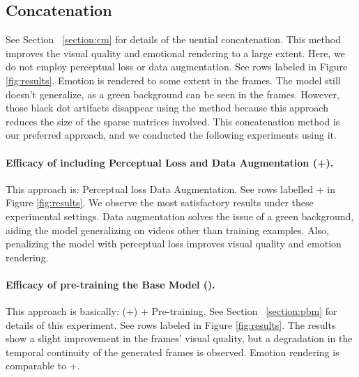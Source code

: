 \documentclass[accepted]{uai2023}
\begin{document}
\subsection{ Concatenation}
See Section ~\ref{section:cm} for details of the uential concatenation. This method improves the visual quality and emotional rendering to a large extent. Here, we do not employ perceptual loss or data augmentation. See rows labeled  in Figure \ref{fig:results}. Emotion is rendered to some extent in the frames. The model still doesn't generalize, as a green background can be seen in the frames. However, those black dot artifacts disappear using the method  because this approach reduces the size of the sparse matrices involved. This concatenation method is our preferred approach, and we conducted the following experiments using it.



\paragraph{Efficacy of including Perceptual Loss and Data Augmentation (+).} 
\label{exp3}
This approach is:   Perceptual loss  Data Augmentation.  See rows labelled + in Figure \ref{fig:results}. We observe the most satisfactory results under these experimental settings. Data augmentation solves the issue of a green background, aiding the model generalizing on videos other than training examples.
Also, penalizing the model with perceptual loss improves visual quality and emotion rendering.

\paragraph{Efficacy of pre-training the Base Model ().}
\label{exp4}
This approach is basically: (+) + Pre-training. See Section ~\ref{section:pbm} for details of this experiment. 
See rows labeled  in Figure \ref{fig:results}.
The results show a slight improvement in the frames' visual quality, but a degradation in the temporal continuity of the generated frames is observed. Emotion rendering is comparable to +.
\end{document}
